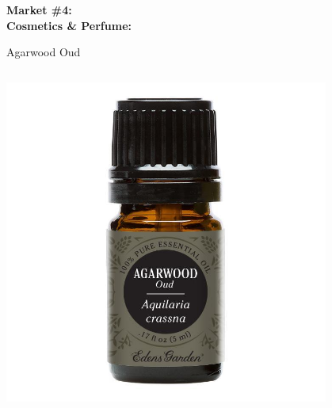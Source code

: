 \documentclass[10pt]{beamer}
\begin{document}
\begin{frame}
	\begin{center}
		\Large{\textbf{\textcolor{myblue}{Market \#4:\\ Cosmetics \& Perfume:}}}\normalsize{}\\ 
		
		\vspace{0.25cm}
		
		Agarwood Oud\\
		
		\vspace{0.5cm}
		
		\begin{columns}
			\begin{column}{0.5\textwidth}
				\begin{center}
					\includegraphics[width=0.8\textwidth]{figures/agarwood.jpg}
				\end{center}
			\end{column}	
			

\end{columns}
\end{center}
\end{frame}
\end{document}
